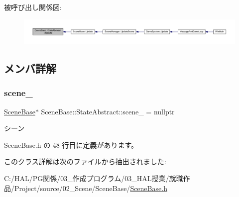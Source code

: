 被呼び出し関係図\+:\nopagebreak
\begin{figure}[H]
\begin{center}
\leavevmode
\includegraphics[width=350pt]{class_scene_base_1_1_state_abstract_a7fca4c5e7d0174af8a147c404f4e6eee_icgraph}
\end{center}
\end{figure}


\subsection{メンバ詳解}
\mbox{\label{class_scene_base_1_1_state_abstract_a322b66f53e08f55bc91aa2a2b4eded02}} 
\subsubsection{\texorpdfstring{scene\+\_\+}{scene\_}}
{\footnotesize\ttfamily \mbox{\hyperlink{class_scene_base}{Scene\+Base}}$\ast$ Scene\+Base\+::\+State\+Abstract\+::scene\+\_\+ = nullptr\hspace{0.3cm}{\ttfamily [protected]}}



シーン 



 Scene\+Base.\+h の 48 行目に定義があります。



このクラス詳解は次のファイルから抽出されました\+:\begin{DoxyCompactItemize}
\item 
C\+:/\+H\+A\+L/\+P\+G関係/03\+\_\+作成プログラム/03\+\_\+\+H\+A\+L授業/就職作品/\+Project/source/02\+\_\+\+Scene/\+Scene\+Base/\mbox{\hyperlink{_scene_base_8h}{Scene\+Base.\+h}}\end{DoxyCompactItemize}
